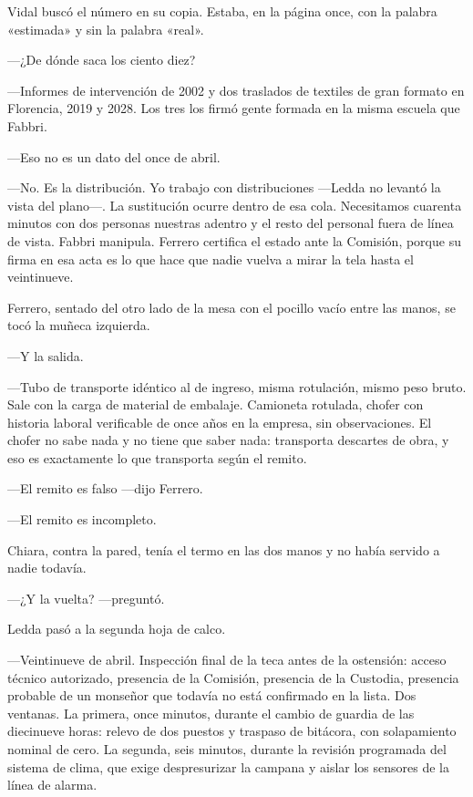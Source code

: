 Vidal buscó el número en su copia. Estaba, en la página once, con la palabra «estimada» y sin la palabra «real».

---¿De dónde saca los ciento diez?

---Informes de intervención de 2002 y dos traslados de textiles de gran formato en Florencia, 2019 y 2028. Los tres los firmó gente formada en la misma escuela que Fabbri.

---Eso no es un dato del once de abril.

---No. Es la distribución. Yo trabajo con distribuciones ---Ledda no levantó la vista del plano---. La sustitución ocurre dentro de esa cola. Necesitamos cuarenta minutos con dos personas nuestras adentro y el resto del personal fuera de línea de vista. Fabbri manipula. Ferrero certifica el estado ante la Comisión, porque su firma en esa acta es lo que hace que nadie vuelva a mirar la tela hasta el veintinueve.

Ferrero, sentado del otro lado de la mesa con el pocillo vacío entre las manos, se tocó la muñeca izquierda.

---Y la salida.

---Tubo de transporte idéntico al de ingreso, misma rotulación, mismo peso bruto. Sale con la carga de material de embalaje. Camioneta rotulada, chofer con historia laboral verificable de once años en la empresa, sin observaciones. El chofer no sabe nada y no tiene que saber nada: transporta descartes de obra, y eso es exactamente lo que transporta según el remito.

---El remito es falso ---dijo Ferrero.

---El remito es incompleto.

Chiara, contra la pared, tenía el termo en las dos manos y no había servido a nadie todavía.

---¿Y la vuelta? ---preguntó.

Ledda pasó a la segunda hoja de calco.

---Veintinueve de abril. Inspección final de la teca antes de la ostensión: acceso técnico autorizado, presencia de la Comisión, presencia de la Custodia, presencia probable de un monseñor que todavía no está confirmado en la lista. Dos ventanas. La primera, once minutos, durante el cambio de guardia de las diecinueve horas: relevo de dos puestos y traspaso de bitácora, con solapamiento nominal de cero. La segunda, seis minutos, durante la revisión programada del sistema de clima, que exige despresurizar la campana y aislar los sensores de la línea de alarma.

